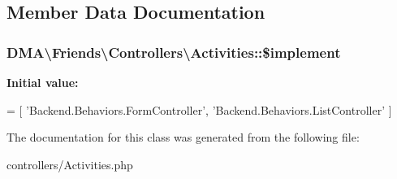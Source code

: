 \subsection{Member Data Documentation}
\hypertarget{classDMA_1_1Friends_1_1Controllers_1_1Activities_aff57941f0ab53e417ce578994badc87f}{
\subsubsection[{\$implement}]{\setlength{\rightskip}{0pt plus 5cm}D\-M\-A\textbackslash{}\-Friends\textbackslash{}\-Controllers\textbackslash{}\-Activities\-::\$implement}}\label{classDMA_1_1Friends_1_1Controllers_1_1Activities_aff57941f0ab53e417ce578994badc87f}
{\bfseries Initial value\-:}
\begin{DoxyCode}
= [
        \textcolor{stringliteral}{'Backend.Behaviors.FormController'},
        \textcolor{stringliteral}{'Backend.Behaviors.ListController'}
    ]
\end{DoxyCode}


The documentation for this class was generated from the following file\-:\begin{DoxyCompactItemize}
\item 
controllers/Activities.\-php\end{DoxyCompactItemize}
